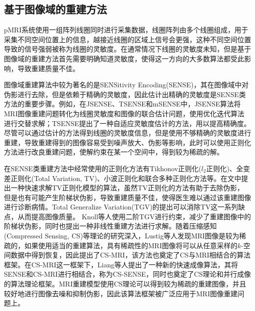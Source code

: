 \documentclass[UTF8]{article}
\begin{document}
\subsection{基于图像域的重建方法}
\par pMRI系统使用一组阵列线圈同时进行采集数据，线圈阵列由多个线圈组成，用于采集不同空间位置上的信息，越接近线圈的区域上信号会更强，这种不同空间位置导致的信号强弱被称为线圈的灵敏度。在通常情况下线圈的灵敏度未知，但是基于图像域的重建方法首先需要明确知道灵敏度，使得这一方向的大多数算法都受此影响，导致重建质量不佳。
\par 图像域重建算法中较为著名的是SENSitivity Encoding(SENSE)\cite{pruessmann1999sense}，其在图像域中对伪影进行去除，但是依赖于精确的灵敏度，因此估计出精确的灵敏度是SENSE类方法的重要步骤。例如，在JSENSE\cite{ying2007joint}、TSENSE\cite{kellman2001adaptive}和mSENSE\cite{kreitner2006fast}中，JSENSE算法将MRI图像重建问题转化为线圈灵敏度和图像的联合估计问题，使用优化迭代算法进行交替求解；TSENSE提出了一种自适应灵敏度估计的方法，用以提高精确度。尽管可以通过估计的方法得到线圈的灵敏度信息，但是使用不够精确的灵敏度进行重建，导致重建得到的图像容易受到噪声放大、伪影等影响，此时可以使用正则化方法进行改良重建问题，使解约束在某一个空间中，得到较为稀疏的解。
\par 在SENSE类重建方法中经常使用的正则化方法有Tikhonov正则化($l_2$正则化)、全变差正则化(Total Variation, TV)、小波正则化和联合多种正则化方法等。在文\cite{ye2010computational}中提出一种快速求解TV正则化模型的算法，虽然TV正则化的方法有助于去除伪影， 但是也有可能产生阶梯状伪影，导致重建质量不佳，使得医生难以通过该重建图像进行诊断病情。Total Generalize Variation(TGV)\cite{bredies2010total}的提出可以消除TV这一系列缺点，从而提高图像质量。 Knoll等人\cite{knoll2012parallel}使用二阶TGV进行约束，减少了重建图像中的阶梯状伪影，同时也提出一种非线性重建方法进行求解。随着压缩感知(Compressed Sensing, CS)等理论的研究深入，Lustig等人发现MRI图像是较为稀疏的，如果使用适当的重建算法，具有稀疏性的MRI图像将可以从任意采样的$k$-空间数据中得到恢复，因此提出了CS-MRI\cite{lustig2007sparse}，该方法也奠定了CS与MRI相结合的算法框架。在CS-MRI这一框架下，Liang等人提出了一种新的快速成像算法，其将SENSE和CS-MRI进行相结合，称为CS-SENSE\cite{liang2009accelerating}，同时也奠定了CS理论和并行成像的算法理论框架。MRI重建模型使用CS理论可以得到较为稀疏的重建图像，并且较好地进行图像去噪和抑制伪影，因此该算法框架被广泛应用于MRI图像重建问题上。
\end{document}
